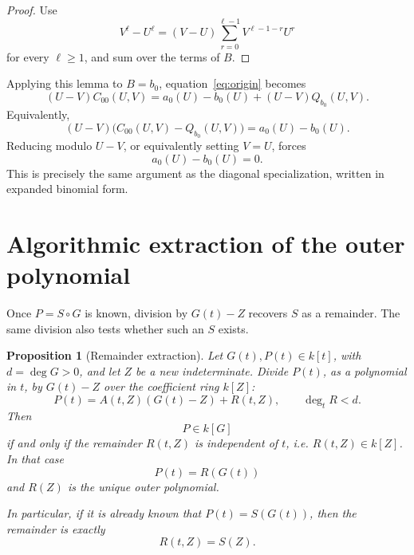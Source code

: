 \documentclass[11pt]{article}
\theoremstyle{plain}
\newtheorem{proposition}[theorem]{Proposition}
\theoremstyle{definition}
\theoremstyle{remark}
\newcommand{\U}{U}
\newcommand{\V}{V}
\begin{document}
\begin{proof}
Use
\[
    \V^\ell-\U^\ell
    =
    (\V-\U)\sum_{r=0}^{\ell-1}\V^{\ell-1-r}\U^r
\]
for every \(\ell\geq 1\), and sum over the terms of \(B\).
\end{proof}

Applying this lemma to \(B=b_0\), equation~\eqref{eq:origin} becomes
\[
    (\U-\V)C_{00}(\U,\V)
    =
    a_0(\U)-b_0(\U)+(\U-\V)Q_{b_0}(\U,\V).
\]
Equivalently,
\[
    (\U-\V)\bigl(C_{00}(\U,\V)-Q_{b_0}(\U,\V)\bigr)
    =
    a_0(\U)-b_0(\U).
\]
Reducing modulo \(\U-\V\), or equivalently setting \(\V=\U\), forces
\[
    a_0(\U)-b_0(\U)=0.
\]
This is precisely the same argument as the diagonal specialization, written in expanded binomial form.

\section{Algorithmic extraction of the outer polynomial}

Once \(P=S\circ G\) is known, division by \(G(t)-Z\) recovers \(S\) as a remainder. The same division also tests whether such an \(S\) exists.

\begin{proposition}[Remainder extraction]\label{prop:algorithmic-extraction}
Let \(G(t),P(t)\in k[t]\), with \(d=\deg G>0\), and let \(Z\) be a new indeterminate. Divide \(P(t)\), as a polynomial in \(t\), by \(G(t)-Z\) over the coefficient ring \(k[Z]\):
\[
    P(t)=A(t,Z)(G(t)-Z)+R(t,Z),
    \qquad \deg_t R<d.
\]
Then
\[
    P\in k[G]
\]
if and only if the remainder \(R(t,Z)\) is independent of \(t\), i.e. \(R(t,Z)\in k[Z]\). In that case
\[
    P(t)=R(G(t))
\]
and \(R(Z)\) is the unique outer polynomial.

In particular, if it is already known that \(P(t)=S(G(t))\), then the remainder is exactly
\[
    R(t,Z)=S(Z).
\]
\end{proposition}
\end{document}
